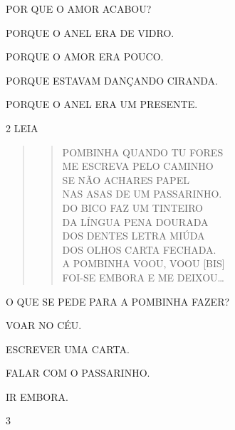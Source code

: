 \pagebreak
POR QUE O AMOR ACABOU?

\begin{escolha}
\item PORQUE O ANEL ERA DE VIDRO.

\item PORQUE O AMOR ERA POUCO.

\item PORQUE ESTAVAM DANÇANDO CIRANDA.

\item PORQUE O ANEL ERA UM PRESENTE.
\end{escolha}

\num{2} LEIA

\begin{quote}
\begin{verse}
POMBINHA QUANDO TU FORES\\
ME ESCREVA PELO CAMINHO\\
SE NÃO ACHARES PAPEL\\
NAS ASAS DE UM PASSARINHO.\\
DO BICO FAZ UM TINTEIRO\\
DA LÍNGUA PENA DOURADA\\
DOS DENTES LETRA MIÚDA\\
DOS OLHOS CARTA FECHADA.\\
A POMBINHA VOOU, VOOU [BIS]\\
FOI-SE EMBORA E ME DEIXOU\ldots{}
\end{verse}

\end{quote}

O QUE SE PEDE PARA A POMBINHA FAZER?

\begin{escolha}
\item VOAR NO CÉU.

\item ESCREVER UMA CARTA.

\item FALAR COM O PASSARINHO.

\item IR EMBORA. 
\end{escolha}

\pagebreak
\num{3}

